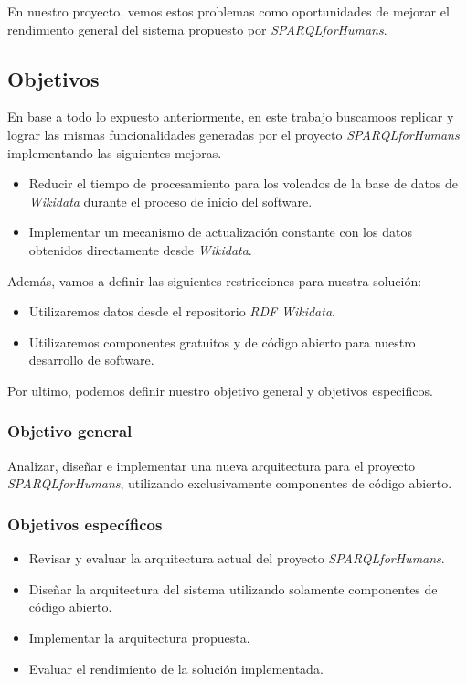 En nuestro proyecto, vemos estos problemas como oportunidades de mejorar el rendimiento general del sistema propuesto por \textit{SPARQLforHumans}.

\subsection{Objetivos}

En base a todo lo expuesto anteriormente, en este trabajo buscamoos replicar y lograr las mismas funcionalidades generadas por el proyecto \textit{SPARQLforHumans} implementando las siguientes mejoras.

\begin{itemize}
    \item Reducir el tiempo de procesamiento para los volcados de la base de datos de \textit{Wikidata} durante el proceso de inicio del software.
    \item Implementar un mecanismo de actualización constante con los datos obtenidos directamente desde \textit{Wikidata}.
\end{itemize}

Además, vamos a definir las siguientes restricciones para nuestra solución:

\begin{itemize}
    \item Utilizaremos datos desde el repositorio \textit{RDF} \textit{Wikidata}.
    \item Utilizaremos componentes gratuitos y de código abierto para nuestro desarrollo de software.
\end{itemize}

Por ultimo, podemos definir nuestro objetivo general y objetivos especificos.

\subsubsection{Objetivo general}

Analizar, diseñar e implementar una nueva arquitectura para el proyecto \textit{SPARQLforHumans}, utilizando exclusivamente componentes de código abierto.

\subsubsection{Objetivos específicos}

\begin{itemize}
    \item Revisar y evaluar la arquitectura actual del proyecto \textit{SPARQLforHumans}.
    \item Diseñar la arquitectura del sistema utilizando solamente componentes de código abierto.
    \item Implementar la arquitectura propuesta.
    \item Evaluar el rendimiento de la solución implementada.
\end{itemize}
